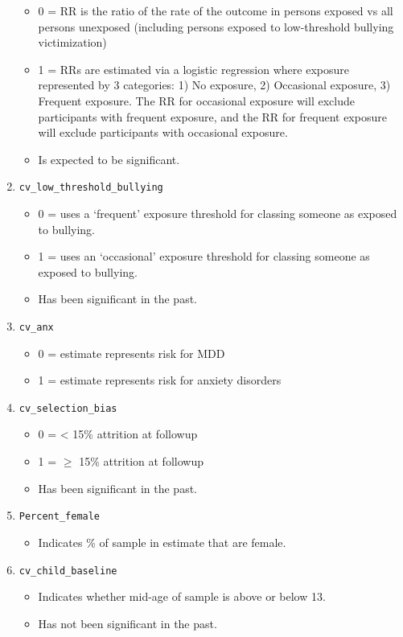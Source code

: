 \begin{enumerate}
	\begin{itemize}
		\item 0 = RR is the ratio of the rate of the outcome in persons exposed vs all persons unexposed (including persons exposed to low-threshold bullying victimization)
		\item 1 =  RRs are estimated via a logistic regression where exposure represented by 3 categories: 1) No exposure, 2) Occasional exposure, 3) Frequent exposure. The RR for occasional exposure will exclude participants with frequent exposure, and the RR for frequent exposure will exclude participants with occasional exposure. 
		\item Is expected to be significant.
	\end{itemize}
	\item \texttt{cv\_low\_threshold\_bullying}
	\begin{itemize}
		\item 0 = uses a ‘frequent’ exposure  threshold for classing someone as exposed to bullying.
		\item 1 = uses an ‘occasional’ exposure threshold for classing someone as exposed to bullying.
		\item Has been significant in the past. 
	\end{itemize}
	\item \texttt{cv\_anx}
	\begin{itemize}
		\item 0 = estimate represents risk for MDD
		\item 1 = estimate represents risk for anxiety disorders
	\end{itemize}
	\item \texttt{cv\_selection\_bias}
	\begin{itemize}
		\item 0 = < 15\% attrition at followup
		\item 1 = $\geqslant$ 15\% attrition at followup
		\item Has been significant in the past.
	\end{itemize}
	\item \texttt{Percent\_female}
	\begin{itemize}
		\item Indicates \% of sample in estimate that are female. 
	\end{itemize}
	\item \texttt{cv\_child\_baseline}
	\begin{itemize}
	    \item Indicates whether mid-age of sample is above or below 13.
		\item Has not been significant in the past.
	\end{itemize}
\end{enumerate}
